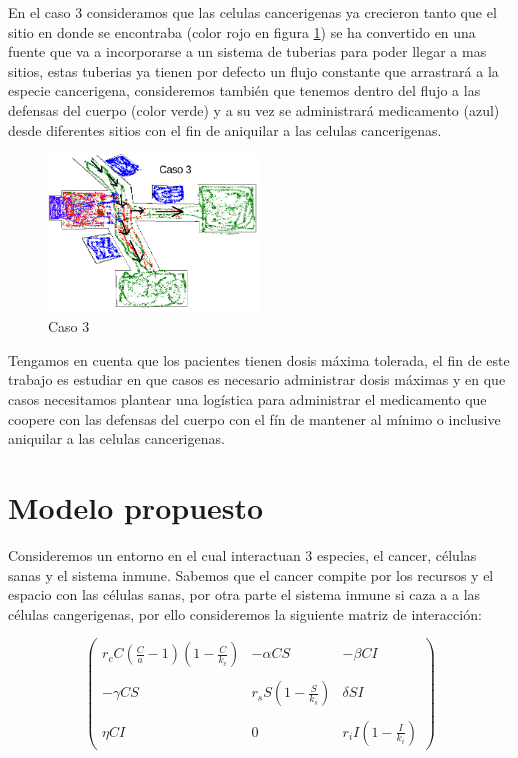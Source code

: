 \documentclass{article}
\begin{document}
En el caso 3 consideramos que las celulas cancerigenas ya crecieron tanto que el sitio en donde se encontraba (color rojo en figura \ref{fig:case_3}) se ha convertido en una fuente que va a incorporarse a un sistema de tuberias para poder llegar a mas sitios, estas tuberias ya tienen por defecto un flujo constante que arrastrará a la especie cancerigena, consideremos también que tenemos dentro del flujo a las defensas del cuerpo (color verde) y a su vez se administrará medicamento (azul) desde diferentes sitios con el fin de aniquilar a las celulas cancerigenas. 

\begin{figure}[ht]
    \centering
    \includegraphics[width=0.5\textwidth]{images/caso3.png}
    \caption{Caso 3}
    \label{fig:case_3}
\end{figure}

Tengamos en cuenta que los pacientes tienen dosis máxima tolerada, el fin de este trabajo es estudiar en que casos es necesario administrar dosis máximas y en que casos necesitamos plantear una logística para administrar el medicamento que coopere con las defensas del cuerpo con el fín de mantener al mínimo o inclusive aniquilar a las celulas cancerigenas.


\section{Modelo propuesto}

Consideremos un entorno en el cual interactuan 3 especies, el cancer, células sanas y el sistema inmune. Sabemos que el cancer compite por los recursos y el espacio con las células sanas, por otra parte el sistema inmune si caza a a las células cangerigenas, por ello consideremos la siguiente matriz de interacción:

\begin{equation}
    \begin{pmatrix}
       r_c C (\frac{C}{a} - 1)(1-\frac{C}{k_c}) & -\alpha CS & -\beta CI \\ \\
    -\gamma CS & r_s S (1 - \frac{S}{k_s}) & \delta SI \\ \\
    \eta C I & 0 & r_i I(1-\frac{I}{k_i})
    \end{pmatrix}
    \label{eqn:matriz_interaccion}
\end{equation}
 
\end{document}
